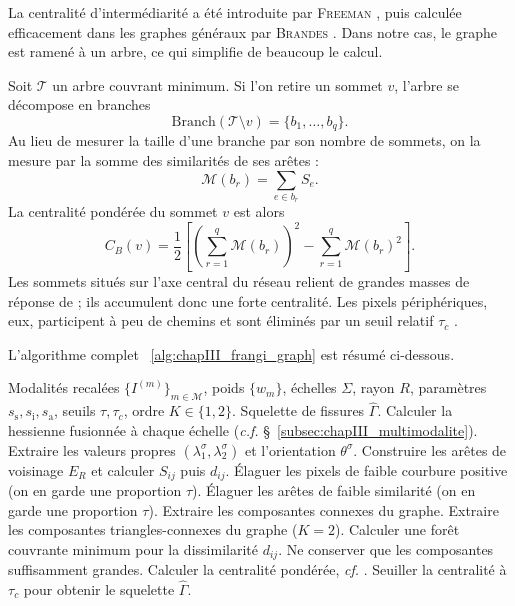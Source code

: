 La centralité d'intermédiarité a été introduite par \textsc{Freeman} \cite{Freeman1977}, puis calculée efficacement dans les graphes généraux par \textsc{Brandes} \cite{Brandes2001}. Dans notre cas, le graphe est ramené à un arbre, ce qui simplifie de beaucoup le calcul.

Soit $\mathcal T$ un arbre couvrant minimum. Si l'on retire un sommet $v$, l'arbre se décompose en branches
\[
    \mathrm{Branch}(\mathcal T\setminus v)=\{b_1,\ldots,b_q\}.
\]
Au lieu de mesurer la taille d'une branche par son nombre de sommets, on la mesure par la somme des similarités de ses arêtes :
\begin{equation}
    \mathcal M(b_r)=\sum_{e\in b_r} S_e.
\end{equation}
La centralité pondérée du sommet $v$ est alors
\begin{equation}
    C_B(v)
    =
    \frac12
    \left[
        \left(\sum_{r=1}^q \mathcal M(b_r)\right)^2
        -
        \sum_{r=1}^q \mathcal M(b_r)^2
    \right].
    \label{eq:chapIII_betweenness}
\end{equation}
Les sommets situés sur l'axe central du réseau relient de grandes masses de réponse de \Frangi{} ; ils accumulent donc une forte centralité. Les pixels périphériques, eux, participent à peu de chemins et sont éliminés par un seuil relatif $\tau_c$ \cite{BibiISPRS}.

L'algorithme complet \Alg~\ref{alg:chapIII_frangi_graph} est résumé ci-dessous.

\begin{algorithm}[H]
\caption{Extraction d'un squelette par graphe de \Frangi{} généralisé}
\label{alg:chapIII_frangi_graph}
\begin{algorithmic}[1]
\Require Modalités recalées $\{I^{(m)}\}_{m\in\mathcal M}$, poids $\{w_m\}$, échelles $\Sigma$, rayon $R$, paramètres $s_{\mathrm{s}},s_{\mathrm{i}},s_{\mathrm{a}}$, seuils $\tau,\tau_c$, ordre $K\in\{1,2\}$.
\Return Squelette de fissures $\widehat\Gamma$.
\State Calculer la hessienne fusionnée à chaque échelle (\emph{c.f.} \S~\ref{subsec:chapIII_multimodalite}).
\State Extraire les valeurs propres $(\lambda_1^\sigma,\lambda_2^\sigma)$ et l'orientation $\theta^\sigma$.
\State Construire les arêtes de voisinage $E_R$ et calculer $S_{ij}$ puis $d_{ij}$.
\State Élaguer les pixels de faible courbure positive (on en garde une proportion $\tau$).
\State Élaguer les arêtes de faible similarité (on en garde une proportion $\tau$).
    \State Extraire les composantes connexes du graphe.
\Else
    \State Extraire les composantes triangles-connexes du graphe ($K=2$).
\EndIf
\State Calculer une forêt couvrante minimum pour la dissimilarité $d_{ij}$.
\State Ne conserver que les composantes suffisamment grandes.
\State Calculer la centralité pondérée, \emph{cf.} .
\State Seuiller la centralité à $\tau_c$ pour obtenir le squelette $\widehat\Gamma$.
\end{algorithmic}
\end{algorithm}

